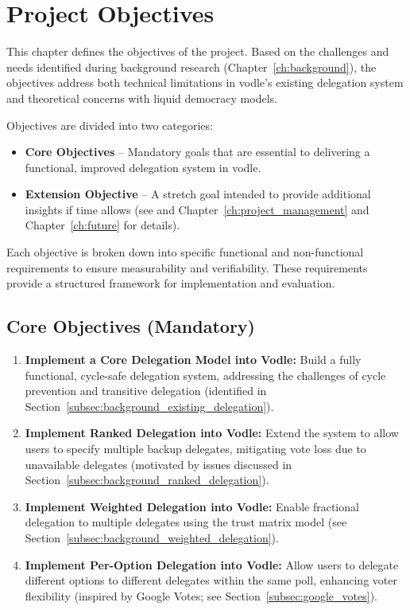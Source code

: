 \chapter{Project Objectives}
\label{ch:project_objectives}

This chapter defines the objectives of the project. Based on the challenges and needs identified during background research (Chapter~\ref{ch:background}), the objectives address both technical limitations in vodle's existing delegation system and theoretical concerns with liquid democracy models.

Objectives are divided into two categories:
\begin{itemize}
    \item \textbf{Core Objectives} -- Mandatory goals that are essential to delivering a functional, improved delegation system in vodle.
    \item \textbf{Extension Objective} -- A stretch goal intended to provide additional insights if time allows (see and Chapter~\ref{ch:project_management} and Chapter~\ref{ch:future} for details).
\end{itemize}

Each objective is broken down into specific functional and non-functional requirements to ensure measurability and verifiability. These requirements provide a structured framework for implementation and evaluation.

\section{Core Objectives (Mandatory)}
\begin{enumerate}
    \item \textbf{Implement a Core Delegation Model into Vodle:} Build a fully functional, cycle-safe delegation system, addressing the challenges of cycle prevention and transitive delegation (identified in Section~\ref{subsec:background_existing_delegation}).

    \item \textbf{Implement Ranked Delegation into Vodle:} Extend the system to allow users to specify multiple backup delegates, mitigating vote loss due to unavailable delegates (motivated by issues discussed in Section~\ref{subsec:background_ranked_delegation}).

    \item \textbf{Implement Weighted Delegation into Vodle:} Enable fractional delegation to multiple delegates using the trust matrix model (see Section~\ref{subsec:background_weighted_delegation}).

    \item \textbf{Implement Per-Option Delegation into Vodle:} Allow users to delegate different options to different delegates within the same poll, enhancing voter flexibility (inspired by Google Votes; see Section~\ref{subsec:google_votes}).
\end{enumerate}

